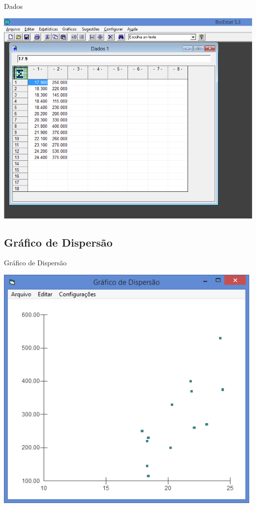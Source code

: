 \documentclass{beamer}
\begin{document}
\begin{frame}{Dados}
  \begin{center}
    \includegraphics[height=0.9\textheight]{Pratica_Desc/dados}
  \end{center}
\end{frame}


\subsection{Gráfico de Dispersão}

\begin{frame}{Gráfico de Dispersão}
  \begin{center}
    \includegraphics[height=0.9\textheight]{Pratica_Assoc/grafico_dispersao}
  \end{center}
\end{frame}
\end{document}
